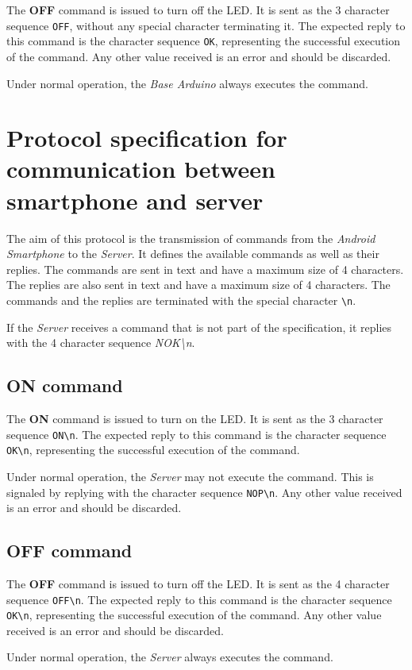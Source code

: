 \documentclass[conference, a4paper]{IEEEtran}
\begin{document}
The \textbf{OFF} command is issued to turn off the LED. It is sent as the 3 character sequence \texttt{OFF}, without any special character terminating it. The expected reply to this command is the character sequence \texttt{OK}, representing the successful execution of the command. Any other value received is an error and should be discarded.

Under normal operation, the \textit{Base Arduino} always executes the command.

\section{Protocol specification for communication between smartphone and server}
\label{prot_smart}

The aim of this protocol is the transmission of commands from the \textit{Android Smartphone} to the \textit{Server}. It defines the available commands as well as their replies. The commands are sent in text and have a maximum size of 4 characters. The replies are also sent in text and have a maximum size of 4 characters. The commands and the replies are terminated with the special character \texttt{\textbackslash n}.

If the \textit{Server} receives a command that is not part of the specification, it replies with the 4 character sequence \textit{NOK\textbackslash n}.

\subsection{ON command}

The \textbf{ON} command is issued to turn on the LED. It is sent as the 3 character sequence \texttt{ON\textbackslash n}. The expected reply to this command is the character sequence \texttt{OK\textbackslash n}, representing the successful execution of the command.

Under normal operation, the \textit{Server} may not execute the command. This is signaled by replying with the character sequence \texttt{NOP\textbackslash n}. Any other value received is an error and should be discarded.

\subsection{OFF command}

The \textbf{OFF} command is issued to turn off the LED. It is sent as the 4 character sequence \texttt{OFF\textbackslash n}. The expected reply to this command is the character sequence \texttt{OK\textbackslash n}, representing the successful execution of the command. Any other value received is an error and should be discarded.

Under normal operation, the \textit{Server} always executes the command.

\end{document}
